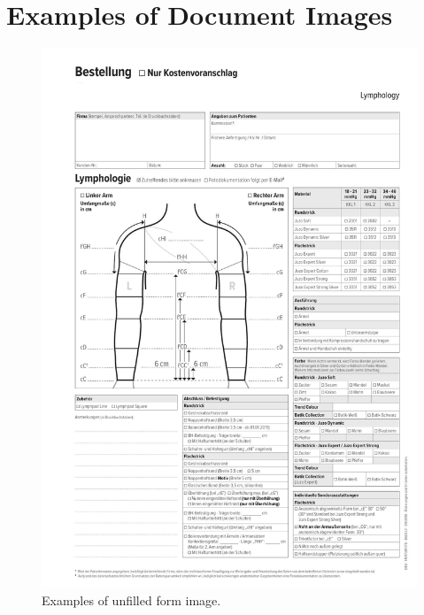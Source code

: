 \section{Examples of Document Images}
\vspace*{0.5cm}
\begin{figure}[H]
        \begin{center}
	    \includegraphics[scale=0.29]{images/EmptyForm.png}
	    \caption[Example of unfilled form image.]{Examples of unfilled form image.}
	    \label{fig:EmptyForm}
	    \end{center}
\end{figure}

